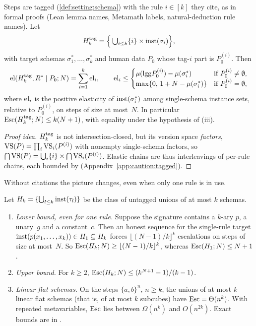 \begin{theorem}\label{thm:caution:tagged}
Steps are tagged (\cref{def:setting:schema}) with the rule $i\in[k]$ they cite, as in formal proofs (Lean lemma names, Metamath labels, natural-deduction rule names). Let
\[
H^{\mathrm{tag}}_{k}=\Big\{\textstyle\bigcup_{i\le k}\{i\}\times\mathrm{inst}(\sigma_i)\Big\},
\]
with target schemas $\sigma^*_1,\dots,\sigma^*_k$ and human data $P_0$ whose tag-$i$ part is $P_0^{(i)}$. Then
\[
\mathrm{el}(H^{\mathrm{tag}}_{k},R^{*}\mid P_0;N)=\sum_{i=1}^k\mathrm{el}_i,\qquad
\mathrm{el}_i\le\begin{cases}\mu(\mathrm{lgg} P_0^{(i)})-\mu(\sigma_i^*)&\text{if }P_0^{(i)}\neq\emptyset,\\ \max\{0,\,1+N-\mu(\sigma^*_i)\}&\text{if }P_0^{(i)}=\emptyset,\end{cases}
\]
where $\mathrm{el}_i$ is the positive elasticity of $\mathrm{inst}(\sigma^*_i)$ among single-schema instance sets, relative to $P_0^{(i)}$, on steps of size at most~$N$. In particular $\mathrm{Esc}(H^{\mathrm{tag}}_{k};N)\le k(N+1)$, with equality under the hypothesis of (iii).
\end{theorem}

\begin{proof}[Proof idea]
$H^{\mathrm{tag}}_{k}$ is not intersection-closed, but its version space \emph{factors}, $\mathrm{VS}(P)=\prod_i\mathrm{VS}_i(P^{(i)})$ with nonempty single-schema factors, so $\bigcap\mathrm{VS}(P)=\bigcup_i\{i\}\times\bigcap\mathrm{VS}_i(P^{(i)})$. Elastic chains are thus interleavings of per-rule chains, each bounded by  (Appendix~\ref{app:caution:tagged}).
\end{proof}

Without citations the picture changes, even when only one rule is in use.

\begin{theorem}\label{thm:caution:untagged}
Let $H_k=\{\bigcup_{l\le k}\mathrm{inst}(\tau_l)\}$ be the class of untagged unions of at most $k$ schemas.
\begin{enumerate}[label=(\roman*)]
\item \emph{Lower bound, even for one rule.} Suppose the signature contains a $k$-ary $p$, a unary~$g$ and a constant~$c$. Then an honest sequence for the single-rule target $\mathrm{inst}(p(x_1,\dots,x_k))\in H_1\subseteq H_k$ forces $\lfloor(N-1)/k\rfloor^k$ escalations on steps of size at most~$N$. So $\mathrm{Esc}(H_k;N)\ge\lfloor(N-1)/k\rfloor^k$, whereas $\mathrm{Esc}(H_1;N)\le N+1$.
\item \emph{Upper bound.} For $k\ge2$, $\mathrm{Esc}(H_k;N)\le(k^{N+1}-1)/(k-1)$.
\item \emph{Linear flat schemas.} On the steps $\{a,b\}^n$, $n\ge k$, the unions of at most $k$ linear flat schemas (that is, of at most $k$ subcubes) have $\mathrm{Esc}=\Theta(n^k)$. With repeated metavariables, $\mathrm{Esc}$ lies between $\Omega(n^k)$ and $O(n^{2k})$. Exact bounds are in .
\end{enumerate}
\end{theorem}

